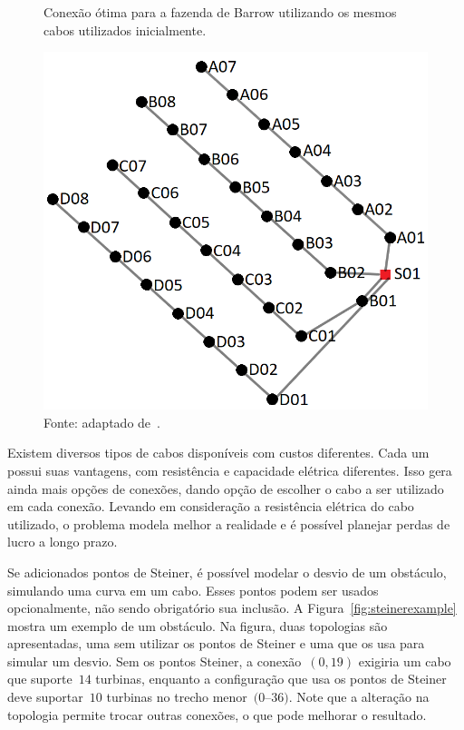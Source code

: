 \begin{figure}[!htb]
  \centering
  \caption[Conexão ótima da fazenda Barrow]{
    Conexão ótima para a fazenda de Barrow utilizando os mesmos cabos utilizados inicialmente.
  }
  \includegraphics[scale=0.4]{estrutura/textuais/figuras/barrow-farm-optimal-same-cables.png}
  \caption*{Fonte: adaptado de~.}
  \label{fig:barrow-optimal}
\end{figure}

Existem diversos tipos de cabos disponíveis com custos diferentes.
Cada um possui suas vantagens, com resistência e capacidade elétrica diferentes.
Isso gera ainda mais opções de conexões, dando opção de escolher o cabo a ser utilizado em cada conexão.
Levando em consideração a resistência elétrica do cabo utilizado, o problema modela melhor a realidade e é possível planejar perdas de lucro a longo prazo.

Se adicionados pontos de Steiner, é possível modelar o desvio de um obstáculo, simulando uma curva em um cabo.
Esses pontos podem ser usados opcionalmente, não sendo obrigatório sua inclusão.
A Figura~\ref{fig:steinerexample} mostra um exemplo de um obstáculo.
Na figura, duas topologias são apresentadas, uma sem utilizar os pontos de Steiner e uma que os usa para simular um desvio.
Sem os pontos Steiner, a conexão~$(0, 19)$ exigiria um cabo que suporte~$14$ turbinas, enquanto a configuração que usa os pontos de Steiner deve suportar~$10$ turbinas no trecho menor~$(0$--$36)$.
Note que a alteração na topologia permite trocar outras conexões, o que pode melhorar o resultado.

